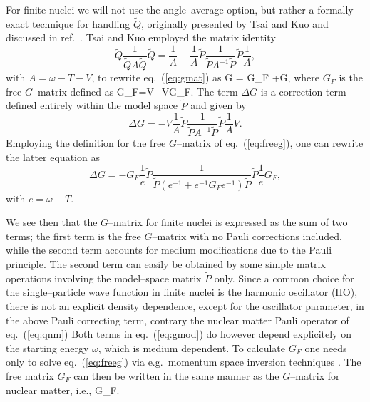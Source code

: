 For finite nuclei we will not use the angle--average option, but rather
a formally
exact technique for handling $\tilde{Q}$, originally presented by
Tsai and Kuo \cite{tk72} and discussed in ref.\ \cite{kkko76}.
Tsai and Kuo employed the matrix identity
\[
\tilde{Q}\frac{1}{\tilde{Q}A\tilde{Q}}
\tilde{Q}=\frac{1}{A}-
\frac{1}{A}\tilde{P}\frac{1}{\tilde{P}A^{-1}\tilde{P}}\tilde{P}\frac{1}{A},
\]
with $A=\omega -T-V$, to rewrite eq.\ (\ref{eq:gmat}) as
\be
G = G_{F} +\Delta G,\label{eq:gmod}
\ee
where $G_{F}$ is the free $G$--matrix defined as
\be
G_{F}=V+VG_{F}. \label{eq:freeg}
\ee
The term $\Delta G$ is a correction term defined entirely within the
model space $\tilde{P}$ and given by
\[
\Delta G =-V\frac{1}{A}\tilde{P}\frac{1}{\tilde{P}A^{-1}\tilde{P}}\tilde{P}\frac{1}{A}V.
\]
Employing the definition for the free $G$--matrix of eq.\ (\ref{eq:freeg}),
one can rewrite the latter equation as
\[
\Delta G =-G_{F}\frac{1}{e}\tilde{P}
\frac{1}{\tilde{P}(e^{-1}+e^{-1}G_{F}e^{-1})\tilde{P}}\tilde{P}\frac{1}{e}G_F,
\]
with $e=\omega -T$.

We see then that the $G$--matrix for finite nuclei
is expressed as the sum of two
terms; the first term is the free $G$--matrix with no Pauli corrections
included, while the second term accounts for medium modifications
due to the Pauli principle. The second term can easily
be obtained by some simple matrix operations involving
the model--space matrix $\tilde{P}$ only.
Since a common choice for the single--particle wave function in finite
nuclei is the harmonic oscillator (HO), there is not
an explicit density dependence, except for the oscillator parameter,
in the above Pauli correcting term,
contrary the nuclear matter Pauli operator of eq.\ (\ref{eq:qnm})
Both terms in eq.\ (\ref{eq:gmod}) do however depend explicitely on the
starting energy $\omega$, which is medium dependent.
To calculate $G_F$ one needs only to solve eq.\ (\ref{eq:freeg})
via e.g.\ momentum space inversion techniques \cite{ms92}.
The free matrix $G_F$ can then be written in the same manner
as the $G$--matrix for nuclear matter, i.e.,
\be
{}G_F.\label{eq:freeg2}
\ee

